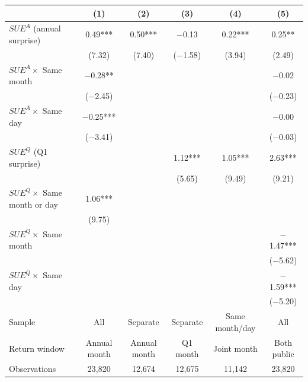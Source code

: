 \begin{tabular}{lccccc}
\toprule
 & (1) & (2) & (3) & (4) & (5)\\
\midrule
$SUE^{A}$ (annual surprise) & 0.49*** & 0.50*** & \ensuremath{-}0.13 & 0.22*** & 0.25**\\
 & (7.32) & (7.40) & (\ensuremath{-}1.58) & (3.94) & (2.49)\\[1pt]
$SUE^{A}\times$ Same month & \ensuremath{-}0.28** &  &  &  & \ensuremath{-}0.02\\
 & (\ensuremath{-}2.45) &  &  &  & (\ensuremath{-}0.23)\\[1pt]
$SUE^{A}\times$ Same day & \ensuremath{-}0.25*** &  &  &  & \ensuremath{-}0.00\\
 & (\ensuremath{-}3.41) &  &  &  & (\ensuremath{-}0.03)\\[1pt]
$SUE^{Q}$ (Q1 surprise) &  &  & 1.12*** & 1.05*** & 2.63***\\
 &  &  & (5.65) & (9.49) & (9.21)\\[1pt]
$SUE^{Q}\times$ Same month or day & 1.06*** &  &  &  & \\
 & (9.75) &  &  &  & \\[1pt]
$SUE^{Q}\times$ Same month &  &  &  &  & \ensuremath{-}1.47***\\
 &  &  &  &  & (\ensuremath{-}5.62)\\[1pt]
$SUE^{Q}\times$ Same day &  &  &  &  & \ensuremath{-}1.59***\\
 &  &  &  &  & (\ensuremath{-}5.20)\\[1pt]
\midrule
Sample & All & Separate & Separate & Same month/day & All\\
Return window & Annual month & Annual month & Q1 month & Joint month & Both public\\
Observations & 23,820 & 12,674 & 12,675 & 11,142 & 23,820\\
\bottomrule
\end{tabular}